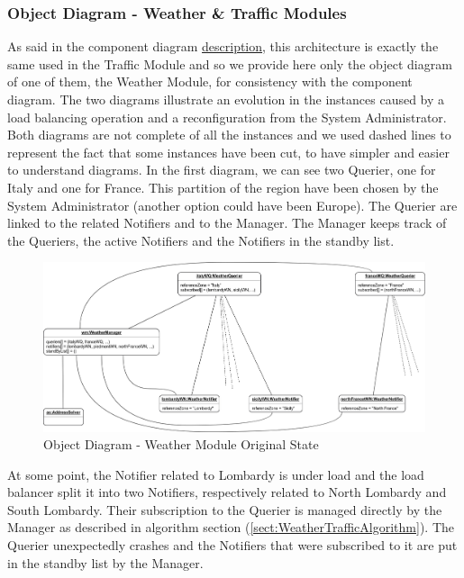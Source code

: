 	\subsubsection{Object Diagram - Weather \& Traffic Modules}
		As said in the component diagram \hyperref[sect:WeatherTrafficModules]{description}, this architecture is exactly the same used in the Traffic Module and so we provide here only the object diagram of one of them, the Weather Module, for consistency with the component diagram.\newline
		The two diagrams illustrate an evolution in the instances caused by a load balancing operation and a reconfiguration from the System Administrator. Both diagrams are not complete of all the instances and we used dashed lines to represent the fact that some instances have been cut, to have simpler and easier to understand diagrams.\newline
		In the first diagram, we can see two Querier, one for Italy and one for France. This partition of the region have been chosen by the System Administrator (another option could have been Europe). The Querier are linked to the related Notifiers and to the Manager. The Manager keeps track of the Queriers, the active Notifiers and the Notifiers in the standby list.
		\begin{figure}[H]
			\centerline{\includegraphics[width=0.9\paperwidth]{Images/OD_WeatherModule_Before}}
			\caption{Object Diagram - Weather Module Original State}
		\end{figure}
		\noindent
		At some point, the Notifier related to Lombardy is under load and the load balancer split it into two Notifiers, respectively related to North Lombardy and South Lombardy. Their subscription to the Querier  is managed directly by the Manager as described in algorithm section (\ref{sect:WeatherTrafficAlgorithm}).\newline
		The  Querier unexpectedly crashes and the Notifiers that were subscribed to it are put in the standby list by the Manager.\newline
